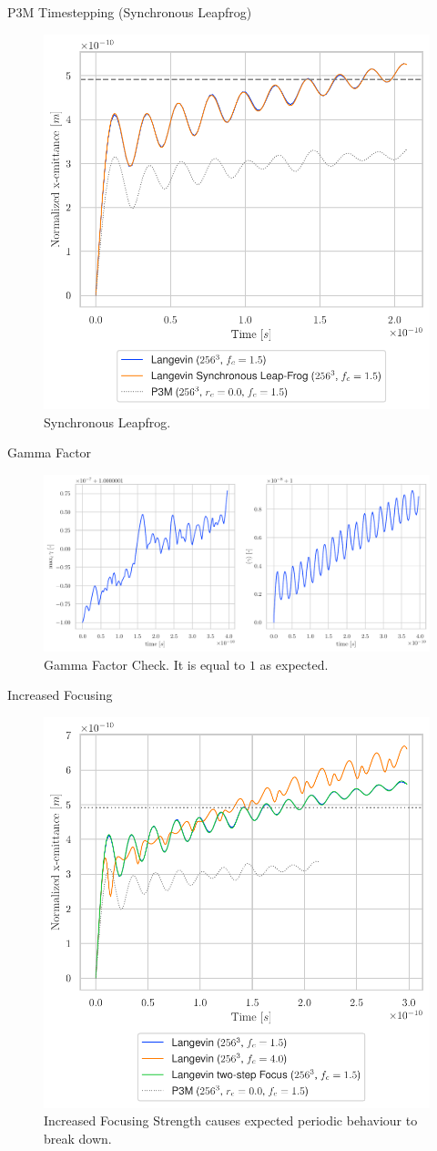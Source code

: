 \begin{frame}{P3M Timestepping (Synchronous Leapfrog)}
    \begin{figure}[!htb]
      \includegraphics[width=0.6\linewidth]{figures/comparison_verlet.pdf}
        \caption{Synchronous Leapfrog.}
      \label{fig:forward_euler}
    \end{figure}
\end{frame}

\begin{frame}{Gamma Factor}
    \begin{figure}[!htb]
      \includegraphics[width=\linewidth]{figures/comparison_gamma.pdf}
        \caption{Gamma Factor Check. It is equal to $1$ as expected.}
      \label{fig:gamma_factor}
    \end{figure}
\end{frame}


\begin{frame}{Increased Focusing}
    \begin{figure}[!htb]
      \includegraphics[width=0.6\linewidth]{figures/comparison_focus.pdf}
        \caption{Increased Focusing Strength causes expected periodic behaviour to break down.}
      \label{fig:increased_focusing}
    \end{figure}
\end{frame}



